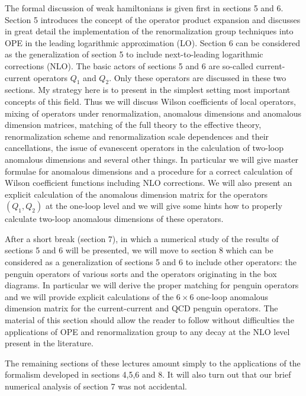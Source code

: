\documentclass[12pt]{article}
\begin{document}
The formal discussion of weak hamiltonians is given first in sections 5 and
6. Section 5 introduces the concept of the operator product expansion and
discusses in great detail the implementation of the renormalization group
techniques into OPE in the leading logarithmic approximation (LO). Section 6
can be considered as the generalization of section 5 to include
next-to-leading logarithmic corrections (NLO). The basic actors of sections 5
and 6 are so-called current-current operators $Q_1$ and $Q_2$. 
Only these
operators are discussed in these two sections. My strategy here is to present
in the simplest setting most important concepts of this field. Thus we will
discuss Wilson coefficients of local operators, mixing of operators under
renormalization, anomalous dimensions and anomalous dimension matrices,
matching of the full theory to the effective theory, renormalization scheme
and renormalization scale dependences and their cancellations, the issue of
evanescent operators in the calculation of two-loop anomalous dimensions and
several other things. In particular we will give master formulae for
anomalous dimensions and a procedure for a correct calculation of Wilson
coefficient functions including NLO corrections. We will also present an
explicit calculation of the anomalous dimension matrix for the operators
$(Q_1, Q_2)$ at the one-loop level and we will give some hints 
how to properly calculate two-loop anomalous dimensions of these operators.

After a short break (section 7), in which a numerical study of the results of
sections 5 and 6 will be presented, we will move to section 8 which can be
considered as a generalization of sections 5 and 6 to include other
operators: the penguin operators of various sorts and the operators
originating in the box diagrams. In particular we will derive the proper
matching for penguin operators and we will provide explicit calculations of
the $6\times 6$ one-loop anomalous dimension matrix for the current-current 
and QCD
penguin operators. The material of this section should allow the reader to
follow without difficulties the applications of OPE and renormalization group
to any decay at the NLO level present in the literature.

The remaining sections of these lectures amount simply to the applications of
the formalism developed in sections 4,5,6 and 8. It will also turn out that
our brief numerical analysis of section 7 was not accidental.
\end{document}
